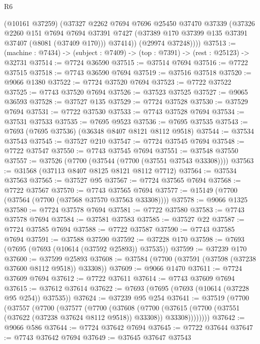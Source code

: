 \begin{lexlean}{R6}
\begin{coremodule}
          (@10161 @37259)
          (@37327
            @2262
            @7694
            @7696
            @25450
            @37470
            @37339
            (@37326
              @2260
              @151
              @7694
              @7694
              @37391
              @7427
              (@37389 @170 @37399 @135 @37391 @37407 (@8081 (@37409 @170)))
              @37414))
          (@29974 @37248))))
@37513 := (machine : @7434) -> (subject : @7409) -> (top : @7391) -> (rest : @25123) -> @32731
@37514 := @7724 @36590
@37515 := @37514 @7694
@37516 := @7722 @37515
@37518 := @7743 @36590 @7694
@37519 := @37516 @37518
@37520 := @9066 @1380
@37522 := @7724 @37520 @7694
@37523 := @7722 @37522
@37525 := @7743 @37520 @7694
@37526 := @37523 @37525
@37527 := @9065 @36593
@37528 := @37527 @135
@37529 := @7724 @37528
@37530 := @37529 @7694
@37531 := @7722 @37530
@37533 := @7743 @37528 @7694
@37534 := @37531 @37533
@37535 := @7695 @9523
@37536 := @7695 @37535
@37543 := @7693 (@7695 @37536) (@36348 @8407 @8121 @8112 @9518)
@37544 := @37534 @37543
@37545 := @37527 @210
@37547 := @7724 @37545 @7694
@37548 := @7722 @37547
@37550 := @7743 @37545 @7694
@37551 := @37548 @37550
@37557 := @37526 (@7700 (@37544 (@7700 (@37551 @37543 @33308))))
@37563 := @31568 (@37113 @8407 @8125 @8121 @8112 @7712)
@37564 := @37534 @37563
@37565 := @37527 @95
@37567 := @7724 @37565 @7694
@37568 := @7722 @37567
@37570 := @7743 @37565 @7694
@37577 := @15149 (@7700 (@37564 (@7700 (@37568 @37570 @37563 @33308))))
@37578 := @9066 @1325
@37580 := @7724 @37578 @7694
@37581 := @7722 @37580
@37583 := @7743 @37578 @7694
@37584 := @37581 @37583
@37585 := @37527 @22
@37587 := @7724 @37585 @7694
@37588 := @7722 @37587
@37590 := @7743 @37585 @7694
@37591 := @37588 @37590
@37592 := @37228 @170
@37598 := @7693 (@7695 (@7693 (@10614 (@37592 @25893)) @37535))
@37599 := @37239 @170
@37600 := @37599 @25893
@37608 := @37584 (@7700 (@37591 (@37598 (@37238 @37600 @8112 @9518)) @33308))
@37609 := @9066 @1470
@37611 := @7724 @37609 @7694
@37612 := @7722 @37611
@37614 := @7743 @37609 @7694
@37615 := @37612 @37614
@37622 := @7693 (@7695 (@7693 (@10614 (@37228 @95 @254)) @37535))
@37624 := @37239 @95 @254
@37641 := @37519
    (@7700
      (@37557
        (@7700
          (@37577
            (@7700
              (@37608
                (@7700
                  (@37615
                    (@7700 (@37551 (@37622 (@37238 @37624 @8112 @9518)) @33308))
                    @33308))))))))
@37642 := @9066 @586
@37644 := @7724 @37642 @7694
@37645 := @7722 @37644
@37647 := @7743 @37642 @7694
@37649 := @37645 @37647 @37543

\end{coremodule}
\end{lexlean}
